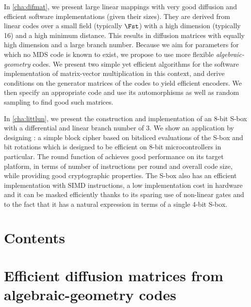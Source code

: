 In \autoref{cha:difmat}, we present large linear mappings with very good diffusion and efficient software implementations
(given their sizes). They are derived from linear codes over a small field (typically $\Fst$) with a high dimension
(typically 16) and a high minimum distance. This results in
diffusion matrices with equally high dimension and a large branch number.
Because we aim for parameters for which no MDS code is known to exist, we propose to use more flexible \emph{algebraic-geometry} codes.
We present two simple yet efficient algorithms for the software implementation of matrix-vector multiplication in this context, and derive
conditions on the generator matrices of the codes to yield efficient encoders. We then specify an appropriate code and use its automorphisms as well as random sampling
to find good such matrices.

In \autoref{cha:littlun}, we present
the construction and implementation of an 8-bit S-box with a differential and linear branch number of 3.
We show an application by designing \littlunpride: a simple block cipher
based on bitsliced evaluations of the S-box and bit rotations which is designed to be efficient on 8-bit microcontrollers in particular.
The round function of \fly achieves good performance on its target platform, in terms of number of instructions per round and overall
code size, while providing good cryptographic properties.
The S-box also has an efficient implementation with SIMD instructions, a low implementation cost in hardware
and it can be masked efficiently thanks to its sparing use of non-linear gates and to the fact that it has a natural expression in
terms of a single 4-bit S-box.

\cleardoublepage
\chapter*{Contents}
\parttoc



\chapter[Matrices de diffusions issues de codes géométriques]{Efficient diffusion matrices from algebraic-geometry codes}
\label{cha:difmat}

